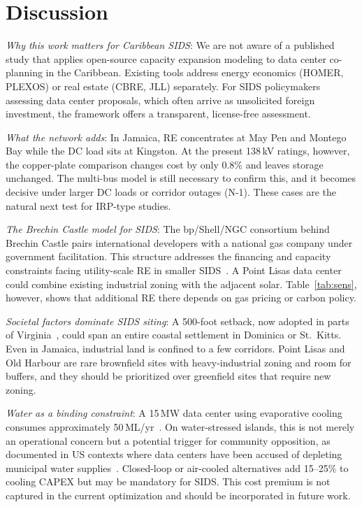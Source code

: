 \documentclass[conference,10pt]{IEEEtran}
\begin{document}
\section{Discussion}

\textit{Why this work matters for Caribbean SIDS}: We are not aware of a published study that applies open-source capacity expansion modeling to data center co-planning in the Caribbean. Existing tools address energy economics (HOMER, PLEXOS) or real estate (CBRE, JLL) separately. For SIDS policymakers assessing data center proposals, which often arrive as unsolicited foreign investment, the framework offers a transparent, license-free assessment.

\textit{What the network adds}: In Jamaica, RE concentrates at May Pen and Montego Bay while the DC load sits at Kingston. At the present 138\,kV ratings, however, the copper-plate comparison changes cost by only 0.8\% and leaves storage unchanged. The multi-bus model is still necessary to confirm this, and it becomes decisive under larger DC loads or corridor outages (N-1). These cases are the natural next test for IRP-type studies.

\textit{The Brechin Castle model for SIDS}: The bp/Shell/NGC consortium behind Brechin Castle pairs international developers with a national gas company under government facilitation. This structure addresses the financing and capacity constraints facing utility-scale RE in smaller SIDS~\cite{brechin_ecp}. A Point Lisas data center could combine existing industrial zoning with the adjacent solar. Table~\ref{tab:sens}, however, shows that additional RE there depends on gas pricing or carbon policy.

\textit{Societal factors dominate SIDS siting}: A 500-foot setback, now adopted in parts of Virginia~\cite{stafford2025}, could span an entire coastal settlement in Dominica or St.~Kitts. Even in Jamaica, industrial land is confined to a few corridors. Point Lisas and Old Harbour are rare brownfield sites with heavy-industrial zoning and room for buffers, and they should be prioritized over greenfield sites that require new zoning.

\textit{Water as a binding constraint}: A 15\,MW data center using evaporative cooling consumes approximately 50\,ML/yr~\cite{compass2025}. On water-stressed islands, this is not merely an operational concern but a potential trigger for community opposition, as documented in US contexts where data centers have been accused of depleting municipal water supplies~\cite{dcwatch2025}. Closed-loop or air-cooled alternatives add 15--25\% to cooling CAPEX but may be mandatory for SIDS. This cost premium is not captured in the current optimization and should be incorporated in future work.
\end{document}
